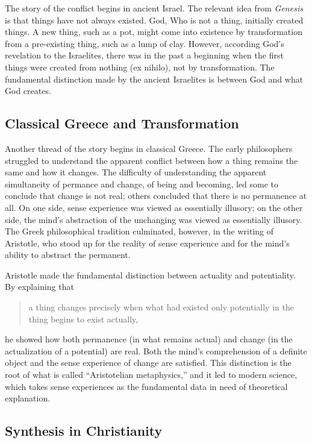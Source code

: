 \documentclass[twocolumn]{article}
\begin{document}
The story of the conflict begins in ancient Israel.  The relevant idea from
{\it Genesis} is that things have not always existed.  God, Who is not a thing,
initially created things.  A new thing, such as a pot, might come into
existence by transformation from a pre-existing thing, such as a lump of clay.
However, according God's revelation to the Israelites, there was in the past a
beginning when the first things were created from nothing (ex nihilo), not by
transformation.  The fundamental distinction made by the ancient Israelites is
between God and what God creates.

\subsection{Classical Greece and Transformation}

Another thread of the story begins in classical Greece.  The early philosophers
struggled to understand the apparent conflict between how a thing remains the
same and how it changes.  The difficulty of understanding the apparent
simultaneity of permance and change, of being and becoming, led some to
conclude that change is not real; others concluded that there is no permanence
at all.  On one side, sense experience was viewed as essentially illusory; on
the other side, the mind's abstraction of the unchanging was viewed as
essentially illusory.  The Greek philosophical tradition culminated, however,
in the writing of Aristotle, who stood up for the reality of sense experience
and for the mind's ability to abstract the permanent.

Aristotle made the fundamental distinction between actuality and potentiality.
By explaining that
\begin{quote}
   a thing changes precisely when what had existed only potentially in the
   thing begins to exist actually,
\end{quote}
he showed how both permanence (in what remains actual) and change (in the
actualization of a potential) are real. Both the mind's comprehension of a
definite object and the sense experience of change are satisfied.  This
distinction is the root of what is called ``Aristotelian metaphysics,'' and it
led to modern science, which takes sense experiences as the fundamental data in
need of theoretical explanation.

\subsection{Synthesis in Christianity}
\end{document}
